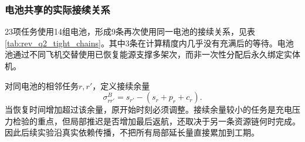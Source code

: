 \subsubsection{电池共享的实际接续关系}
23项任务使用14组电池，形成9条再次使用同一电池的接续关系，见表\ref{tab:rev_q2_tight_chains}。其中3条在计算精度内几乎没有充满后的等待。电池池通过不同飞机交替使用已恢复能源支撑多架次，而非一次性分配后永久绑定实体机。


对同电池的相邻任务$r,r'$，定义接续余量
\begin{equation}
 \sigma_{rr'}^B=s_{r'}-(s_r+p_r+c_r).
 \label{eq:q2_battery_slack}
\end{equation}
当恢复时间增加超过该余量，原开始时刻必须调整。接续余量较小的任务是充电压力检验的重点，但局部推迟是否增加最后返航，还取决于另一条资源链何时完成。因此后续实验沿真实依赖传播，不把所有局部延长量直接累加到工期。
